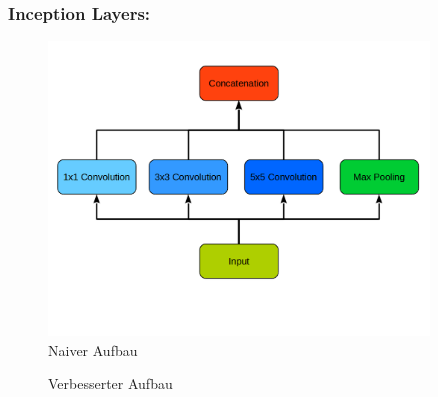 \documentclass[runningheads,a4paper]{llncs}[2015/06/24]
\begin{document}
\subsubsection*{Inception Layers:}
\begin{figure}
	\centering
	\includegraphics[width=0.9\textwidth]{images/inception_naive_graph.png}
	\caption{Naiver Aufbau}
	\label{fig:inception_graph}
\end{figure}
\begin{figure}
	\centering
	\caption{Verbesserter Aufbau}
	\label{fig:inception_graph_improved}
\end{figure}
\end{document}
